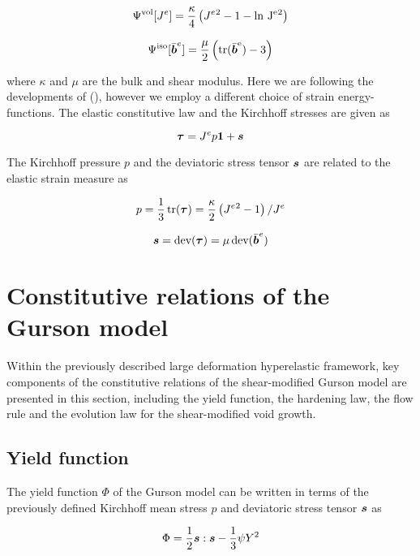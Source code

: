 \begin{equation}
  \Psi^{\rm vol}[J^e] =\frac{\kappa}{4}\left(J^e{^2} - 1 - \rm ln~J^e{^2}\right)
\end{equation}

\begin{equation}
  \Psi^{\rm iso}[\bar{{\boldsymbol{b}}}^e] =
  \frac{\mu}{2}\left(\rm tr(\bar{{\boldsymbol{b}}}^e)-3\right)
\end{equation}

where $\kappa$ and $\mu$ are the bulk and shear modulus. Here we are
following the developments of (\cite{Steinmann1994}), however we
employ a different choice of strain energy-functions. The elastic
constitutive law and the Kirchhoff stresses are given as

\begin{equation}\label{eq:Kirchhoff}
{\boldsymbol{\tau}}=J^e p {\boldsymbol{1}} + {\boldsymbol{s}}
\end{equation}

The Kirchhoff pressure $p$ and the deviatoric stress tensor ${\boldsymbol{s}}$ are
related to the elastic strain measure as

\begin{equation}\label{eq:p}
p = \frac{1}{3}\operatorname{\text{tr}}({\boldsymbol{\tau}}) = \frac{\kappa}{2}\left(J^e{^2}-1\right)/J^e
\end{equation}

\begin{equation}\label{eq:s}
{\boldsymbol{s}} = \operatorname{\text{dev}}({\boldsymbol{\tau}}) = \mu\operatorname{\text{dev}}(\bar{{\boldsymbol{b}}}^e)
\end{equation}

\section{Constitutive relations of the Gurson model}
Within the previously described large deformation hyperelastic
framework, key components of the constitutive relations of the
shear-modified Gurson model are presented in this section, including
the yield function, the hardening law, the flow rule and the evolution
law for the shear-modified void growth.

\subsection{Yield function}

The yield function $\Phi$ of the Gurson model can be written in terms
of the previously defined Kirchhoff mean stress $p$ and deviatoric
stress tensor ${\boldsymbol{s}}$ as

\begin{equation}\label{eq:Phi}
\Phi = \frac{1}{2}{\boldsymbol{s}}:{\boldsymbol{s}} - \frac{1}{3}\psi Y^2
\end{equation}

